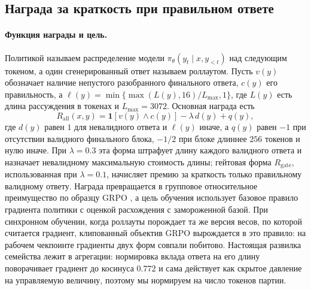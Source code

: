 \documentclass[11pt]{article}
\begin{document}
\subsection{Награда за краткость при правильном ответе}
\label{sec:rl}

\paragraph{Функция награды и цель.} Политикой называем распределение модели $\pi_\theta(y_t\mid x,y_{<t})$ над следующим токеном, а один сгенерированный ответ называем роллаутом. Пусть $v(y)$ обозначает наличие непустого разобранного финального ответа, $c(y)$ его правильность, а $\ell(y)=\min\{\max(L(y),16)/L_{\max},1\}$, где $L(y)$ есть длина рассуждения в токенах и $L_{\max}=3072$. Основная награда есть
\begin{equation}
R_{\mathrm{all}}(x,y)=\mathbf{1}[v(y)\wedge c(y)]-\lambda\,d(y)+q(y),
\label{eq:grpo-reward}
\end{equation}
где $d(y)$ равен $1$ для невалидного ответа и $\ell(y)$ иначе, а $q(y)$ равен $-1$ при отсутствии валидного финального блока, $-1/2$ при блоке длиннее $256$ токенов и нулю иначе. При $\lambda=0.3$ эта форма штрафует длину каждого валидного ответа и назначает невалидному максимальную стоимость длины; гейтовая форма $R_{\mathrm{gate}}$, использованная при $\lambda=0.1$, начисляет премию за краткость только правильному валидному ответу. Награда превращается в групповое относительное преимущество по образцу GRPO \citep{shao2024deepseekmath,deepseekr1}, а цель обучения использует базовое правило градиента политики с оценкой расхождения с замороженной базой. При синхронном обучении, когда роллауты порождает та же версия весов, по которой считается градиент, клипованный объектив GRPO вырождается в это правило: на рабочем чекпоинте градиенты двух форм совпали побитово. Настоящая развилка семейства лежит в агрегации: нормировка вклада ответа на его длину поворачивает градиент до косинуса $0.772$ и сама действует как скрытое давление на управляемую величину, поэтому мы нормируем на число токенов партии.
\end{document}
